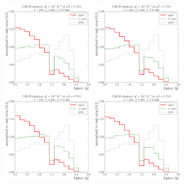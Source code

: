 \begin{figure}[!htbp]
	\centering
	\vspace*{-0.5cm}
	\hspace*{\fill}
  	{\includegraphics[width=0.42\textwidth]{measurement/MET/central/fit_templates/electron_templates_bin_0-25}}\hfill
  	{\includegraphics[width=0.42\textwidth]{measurement/MET/central/fit_templates/electron_templates_bin_25-45}}
  	\hspace*{\fill} \\
  	\hspace*{\fill}
  	{\includegraphics[width=0.42\textwidth]{measurement/MET/central/fit_templates/electron_templates_bin_45-70}}\hfill
  	{\includegraphics[width=0.42\textwidth]{measurement/MET/central/fit_templates/electron_templates_bin_70-100}}

\end{figure}
